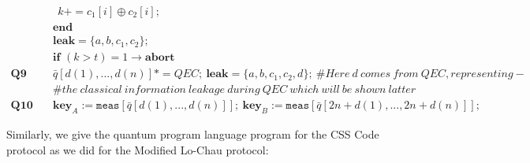 \documentclass{report}
\theoremstyle{defn_style}
\begin{document}
\begin{tcolorbox}[colframe=black!75!black, colback=white, title=Modified Lo-Chau Protocol: Quantum Language Representation]
\begin{align*}
    &~~ k += c_1[i] \oplus c_2[i];\\
    &\textbf{end}\\
    &\textbf{leak}=\{a, b, c_1, c_2\}; \\
    & \textbf{if }  (k>t) = 1 \rightarrow \textbf{abort} \; \\
    \textbf{Q9}  \quad & \bar{q}[d(1),...,d(n)]*=QEC;~\textbf{leak}=\{a, b, c_1, c_2,d\}; ~\#Here ~d ~comes ~from ~QEC, representing- \\
    &\#the ~classical ~information ~leakage ~during ~QEC~which~will~be~shown~latter\\
    \textbf{Q10} \quad & \textbf{key}_{A}:=\texttt{meas} [\bar{q}[d(1),...,d(n)]]; ~\textbf{key}_{B}:=\texttt{meas} [\bar{q}[2n+d(1),...,2n+d(n)]];
\end{align*}
\end{tcolorbox}



\newpage
Similarly, we give the quantum program language program for the CSS Code protocol as we did for the Modified Lo-Chau protocol:
\end{document}
